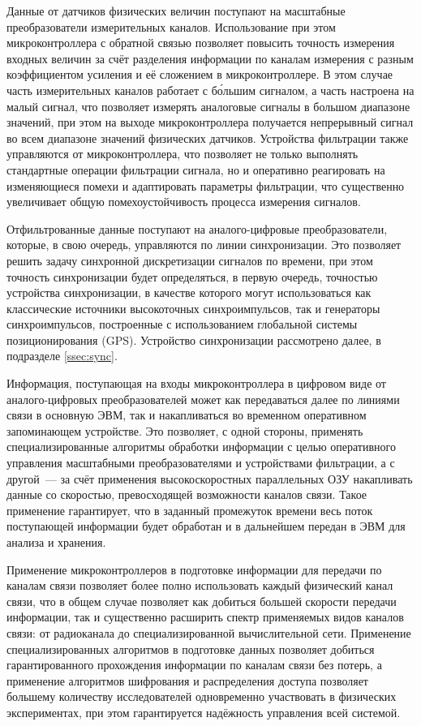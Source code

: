 \documentclass[a4paper, 14pt, titlepage]{extarticle}
\begin{document}
  Данные от датчиков физических величин поступают на масштабные преобразователи измерительных
  каналов. Использование при этом микроконтроллера с обратной связью позволяет повысить точность
  измерения входных величин за счёт разделения информации по каналам
  измерения с разным коэффициентом усиления и её сложением в микроконтроллере. В этом случае часть
  измерительных каналов работает с б\'{о}льшим сигналом, а часть настроена на малый сигнал, что
  позволяет измерять аналоговые сигналы в большом диапазоне значений, при этом на выходе
  микроконтроллера получается непрерывный сигнал во всем диапазоне значений физических датчиков.
  Устройства фильтрации также управляются от микроконтроллера, что позволяет не только выполнять
  стандартные операции фильтрации сигнала, но и оперативно реагировать на изменяющиеся помехи и адаптировать параметры
  фильтрации, что существенно увеличивает общую помехоустойчивость процесса измерения сигналов.

  Отфильтрованные данные поступают на аналого-цифровые преобразователи, которые, в свою очередь,
  управляются по линии синхронизации. Это позволяет решить задачу синхронной дискретизации сигналов
  по времени, при этом точность синхронизации будет определяться, в первую очередь, точностью
  устройства синхронизации, в качестве которого могут использоваться как классические источники
  высокоточных синхроимпульсов, так и генераторы синхроимпульсов, построенные с использованием
  глобальной системы позиционирования (GPS). Устройство синхронизации рассмотрено далее, в
  подразделе \ref{ssec:sync}.

  Информация, поступающая на входы микроконтроллера в цифровом виде от аналого-цифровых
  преобразователей может как передаваться далее по линиями связи в основную ЭВМ, так и
  накапливаться во временном оперативном запоминающем устройстве. Это позволяет, с одной стороны,
  применять специализированные алгоритмы обработки информации с целью оперативного управления
  масштабными преобразователями и устройствами фильтрации, а с другой~--- за счёт применения
  высокоскоростных параллельных ОЗУ накапливать данные со скоростью, превосходящей возможности
  каналов связи. Такое применение гарантирует, что в заданный промежуток времени весь поток
  поступающей информации будет обработан и в дальнейшем передан в ЭВМ для анализа и хранения.

  Применение микроконтроллеров в подготовке информации для передачи по каналам связи позволяет
  более полно использовать каждый физический канал связи, что в общем случае позволяет как добиться
  большей скорости передачи информации, так и существенно расширить спектр применяемых видов каналов
  связи: от радиоканала до специализированной вычислительной сети. Применение специализированных
  алгоритмов в подготовке данных позволяет добиться гарантированного прохождения информации по
  каналам связи без потерь, а применение алгоритмов шифрования и распределения доступа позволяет
  большему количеству исследователей одновременно участвовать в физических экспериментах, при этом
  гарантируется надёжность управления всей системой.
\end{document}
